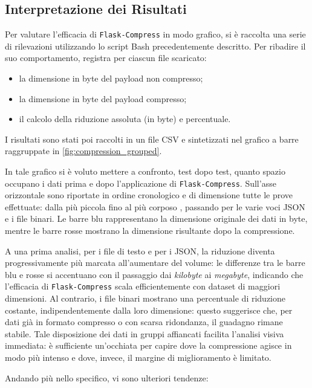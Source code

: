 \subsection{Interpretazione dei Risultati}

Per valutare l'efficacia di \texttt{Flask-Compress} in modo grafico, si è raccolta una serie di rilevazioni utilizzando lo script Bash precedentemente descritto. Per ribadire il suo comportamento, registra per ciascun file scaricato:

\begin{itemize}
  \item la dimensione in byte del payload non compresso;
  \item la dimensione in byte del payload compresso;
  \item il calcolo della riduzione assoluta (in byte) e percentuale.
\end{itemize}

I risultati sono stati poi raccolti in un file CSV e sintetizzati nel grafico a barre raggruppate in \autoref{fig:compression_grouped}. 

In tale grafico si è voluto mettere a confronto, test dopo test, quanto spazio occupano i dati prima e dopo l'applicazione di \texttt{Flask-Compress}. Sull'asse orizzontale sono riportate in ordine cronologico e di dimensione tutte le prove effettuate: dalla più piccola  fino al più corposo , passando per le varie voci JSON e i file binari. Le barre blu rappresentano la dimensione originale dei dati in byte, mentre le barre rosse mostrano la dimensione risultante dopo la compressione.  

A una prima analisi, per i file di testo e per i JSON, la riduzione diventa progressivamente più marcata all'aumentare del volume: le differenze tra le barre blu e rosse si accentuano con il passaggio dai \textit{kilobyte} ai \textit{megabyte}, indicando che l'efficacia di \texttt{Flask-Compress} scala efficientemente con dataset di maggiori dimensioni. Al contrario, i file binari mostrano una percentuale di riduzione costante, indipendentemente dalla loro dimensione: questo suggerisce che, per dati già in formato compresso o con scarsa ridondanza, il guadagno rimane stabile. Tale disposizione dei dati in gruppi affiancati facilita l'analisi visiva immediata: è sufficiente un'occhiata per capire dove la compressione agisce in modo più intenso e dove, invece, il margine di miglioramento è limitato.

Andando più nello specifico, vi sono ulteriori tendenze:

